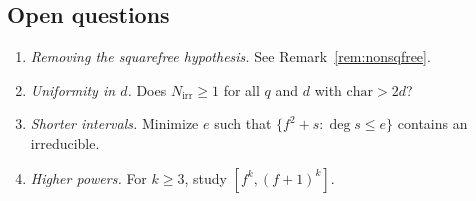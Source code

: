 \documentclass[11pt, a4paper]{article}
\theoremstyle{definition}
\theoremstyle{remark}
\begin{document}
\subsection{Open questions}
\begin{enumerate}[label=(\arabic*)]
\item \emph{Removing the squarefree hypothesis.}
See Remark~\ref{rem:nonsqfree}.

\item \emph{Uniformity in $d$.}
Does $N_{\mathrm{irr}} \ge 1$ for all $q$ and $d$
with $\mathrm{char} > 2d$?

\item \emph{Shorter intervals.}
Minimize $e$ such that $\{f^2 + s : \deg s \le e\}$
contains an irreducible.

\item \emph{Higher powers.}
For $k \ge 3$, study $[f^k, (f+1)^k]$.
\end{enumerate}
\end{document}
